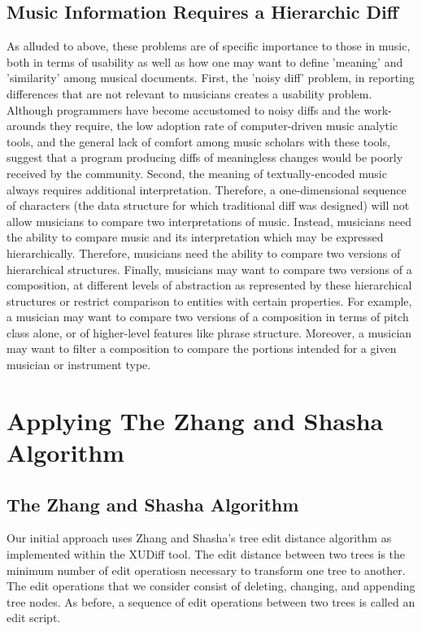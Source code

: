 \documentclass{article}
\begin{document}
\subsection{Music Information Requires a Hierarchic Diff}
As alluded to above, these problems are of specific importance to
those in music, both in terms of usability as well as how one may want
to define 'meaning' and 'similarity' among musical documents.  First,
the 'noisy diff' problem, in reporting differences that are not
relevant to musicians creates a usability problem.  Although
programmers have become accustomed to noisy diffs and the work-arounds
they require, the low adoption rate of computer-driven music analytic
tools, and the general lack of comfort among music scholars with these
tools, suggest that a program producing diffs of meaningless changes
would be poorly received by the community.  Second, the meaning of
textually-encoded music always requires additional interpretation.
Therefore, a one-dimensional sequence of characters (the data
structure for which traditional diff was designed) will not allow
musicians to compare two interpretations of music.  Instead, musicians
need the ability to compare music and its interpretation which may be
expressed hierarchically.  Therefore, musicians need the ability to
compare two versions of hierarchical structures.  Finally, musicians
may want to compare two versions of a composition, at different levels
of abstraction as represented by these hierarchical structures or
restrict comparison to entities with certain properties.  For example,
a musician may want to compare two versions of a composition in terms
of pitch class alone, or of higher-level features like phrase structure. Moreover, a musician may want to filter a composition to
compare the portions intended for a given musician or instrument type.

\section{Applying The Zhang and Shasha Algorithm}
\subsection{The Zhang and Shasha Algorithm}
Our initial approach uses Zhang and Shasha's tree edit distance
algorithm as implemented within the XUDiff tool.  The edit distance
between two trees is the minimum number of edit operatiosn necessary
to transform one tree to another.  The edit operations that we
consider consist of deleting, changing, and appending tree nodes.  As
before, a sequence of edit operations between two trees is called an
edit script.
\end{document}
